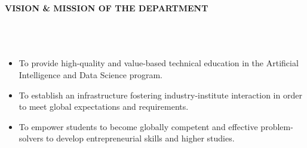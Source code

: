 {}
\fancyhead{}
\fancyfoot{}

\renewcommand{\footrulewidth}{0pt}
\renewcommand{\headrulewidth}{0pt}
\newcommand{\wideunderline}[2][2em]{%
  \underline{\makebox[\ifdim\width>#1\width\else#1\fi]{#2}}%
}
\begin{center}
 \vspace*{1cm}
    \Large \textbf{ VISION \& MISSION OF THE DEPARTMENT}
     \vspace*{2.0cm}
    \\ {\Large \bf \wideunderline[12em]{Vision}}
    \\ \vspace{1.0cm}{
    \large To achieve excellence in Artificial Intelligence and Data Science to cater \\to the ever-changing industrial and socio-economic needs.}
 \vspace*{2.0cm}
    \\ {\Large \bf \wideunderline  [12em]{Mission}}
    \\ \vspace{1.0cm}
  \begin{itemize}
    \item \large To provide high-quality and value-based technical education in the Artificial Intelligence and Data Science program.
    \item \large To establish an infrastructure fostering industry-institute interaction in order to meet global expectations and requirements.
    \item \large To empower students to become globally competent and effective problem-solvers to develop entrepreneurial skills and higher studies.
  \end{itemize}
\end{center}

\renewcommand{\footrulewidth}{0.4pt}